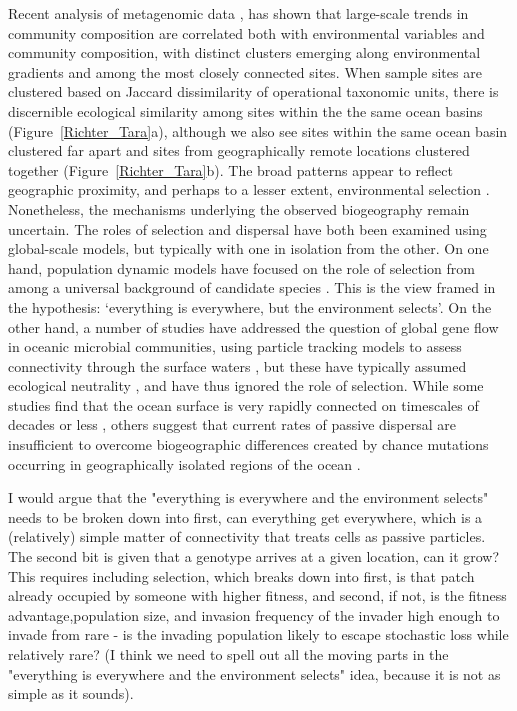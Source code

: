 \documentclass[12pt]{article}
\newcommand{\sinead}[1]{{\color{green} #1}}
\begin{document}
Recent analysis of metagenomic data \citep[Figure~\ref{Richter_Tara} and][]{Richter:2019}, has shown that large-scale trends in community composition are correlated both with environmental variables and community composition, with distinct clusters emerging along environmental gradients and among the most closely connected sites. When sample sites are clustered based on Jaccard dissimilarity of operational taxonomic units, there is discernible ecological similarity among sites within the the same ocean basins (Figure~\ref{Richter_Tara}a), although we also see sites within the same ocean basin clustered far apart and sites from geographically remote locations clustered together (Figure~\ref{Richter_Tara}b). The broad patterns appear to reflect geographic proximity, and perhaps to a lesser extent, environmental selection \citep[][and Figures~\ref{Tara_HughesMartiny} and~\ref{Tara_Dendrogram}]{Richter:2019}. Nonetheless, the mechanisms underlying the observed biogeography remain uncertain. The roles of selection and dispersal have both been examined using global-scale models, but typically with one in isolation from the other. On one hand, population dynamic models have focused on the role of selection from among a universal background of candidate species \citep{Follows:2007}. This is the view framed in the \citet{BaasBecking:1934} hypothesis: `everything is everywhere, but the environment selects'. On the other hand, a number of studies have addressed the question of global gene flow in oceanic microbial communities, using particle tracking models to assess connectivity through the surface waters \citep{Hellweger:2014,Jonsson:2016}, but these have typically assumed ecological neutrality \citep{Hubbell:2001}, and have thus ignored the role of selection. While some studies find that the ocean surface is very rapidly connected on timescales of decades or less \citep{Jonsson:2016}, others suggest that current rates of passive dispersal are insufficient to overcome biogeographic differences created by chance mutations occurring in geographically isolated regions of the ocean \citep{Hellweger:2014}.

\sinead{I would argue that the "everything is everywhere and the environment selects" needs to be broken down into first, can everything get everywhere, which is a (relatively) simple matter of connectivity that treats cells as passive particles. The second bit is given that a genotype arrives at a given location, can it grow? This requires including selection, which breaks down into first, is that patch already occupied by someone with higher fitness, and second, if not, is the fitness advantage,population size, and invasion frequency of the invader high enough to invade from rare - is the invading population likely to escape stochastic loss while relatively rare? (I think we need to spell out all the moving parts in the "everything is everywhere and the environment selects"  idea, because it is not as simple as it sounds).}
\end{document}
